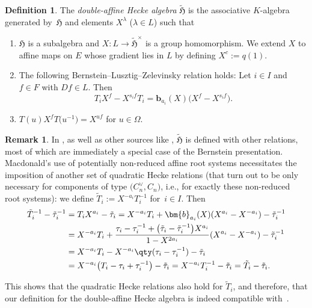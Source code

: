 \documentclass[pdftex]{sigma}
\theoremstyle{definition}
\newtheorem{Definition}[Theorem]{Definition}
\newtheorem{Remark}[Theorem]{Remark}
\numberwithin{equation}{section}
\begin{document}
\begin{Definition}
 The \emph{double-affine Hecke algebra} $\tilde{\mathfrak{H}}$ is
 the associative $K$-algebra generated by~$\mathfrak{H}$ and elements $X^\lambda$ ($\lambda\in L$) such that
 \begin{enumerate}\itemsep=0pt
 \item[(i)] $\mathfrak{H}$ is a subalgebra and $X\colon L\to\tilde{\mathfrak{H}}^\times$
 is a group homomorphism. We extend $X$ to affine maps on $E$ whose gradient lies
 in $L$ by defining $X^c := q(1)$.
 \item[(ii)] The following Bernstein--Lusztig--Zelevinsky relation holds: Let $i\in I$ and $f\in F$ with $Df\in L$. Then
 \begin{equation}\label{eq:x-bernstein}
 T_i X^f - X^{s_if}T_i = \bm{b}_{a_i}(X)\bigl(X^f - X^{s_if}\bigr).
 \end{equation}
 \item[(iii)] $T(u) X^f T\bigl(u^{-1}\bigr) = X^{uf}$ for $u\in\Omega$.
 \end{enumerate}
\end{Definition}
\begin{Remark}
 In \cite[Section~4.7]{macdonald}, as well as other sources
 like \cite[Definition~2.1]{cherednikInduced}, $\tilde{\mathfrak{H}}$
 is defined with other relations, most of which are immediately a special case of
 the Bernstein presentation. Macdonald's use of potentially non-reduced affine root
 systems necessitates the imposition of another set of quadratic Hecke relations
 (that turn out to be only necessary for components of type $\bigl(C_n^\vee, C_n\bigr)$, i.e., for exactly these non-reduced root systems):
 we define
$\tilde{T}_i := X^{-a_i} T_i^{-1}$
 for~${i\in I}$. Then
 \begin{align*}
 \tilde{T}_i^{-1} - \tilde{\tau}_i^{-1} &=
 T_i X^{a_i} - \tilde{\tau}_i= X^{-a_i}T_i + \bm{b}_{a_i}(X)(X^{a_i}-X^{-a_i}) - \tilde{\tau}_i^{-1}\\
 &= X^{-a_i}T_i + \frac{\tau_i - \tau_i^{-1} + \bigl(\tilde{\tau}_i-\tilde{\tau}_i^{-1}\bigr)X^{a_i}}{1-X^{2a_i}} (X^{a_i}-X^{-a_i}) - \tilde{\tau}_i^{-1}\\
 &= X^{-a_i}T_i - X^{-a_i}\qty(\tau_i - \tau_i^{-1})
 - \tilde{\tau}_i\\
 &= X^{-a_i}\bigl(T_i - \tau_i + \tau_i^{-1}\bigr) - \tilde{\tau}_i= X^{-a_i} T_i^{-1} - \tilde{\tau}_i= \tilde{T}_i - \tilde{\tau}_i.
 \end{align*}

 This shows that the quadratic Hecke relations also hold for $\tilde{T}_i$, and therefore, that our definition for the double-affine
 Hecke algebra is indeed compatible with~\cite{cherednikInduced,macdonald}.
\end{Remark}
\end{document}

